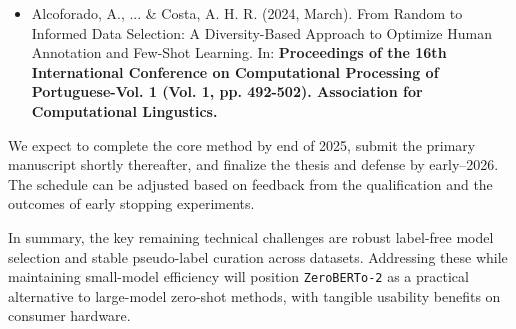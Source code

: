 \documentclass[]{politex-xico}
\begin{document}
\begin{itemize}  
    \item Alcoforado, A., ... \& Costa, A. H. R. (2024, March). From Random to Informed Data Selection: A Diversity-Based Approach to Optimize Human Annotation and Few-Shot Learning. In: \textbf{Proceedings of the 16th International Conference on Computational Processing of Portuguese-Vol. 1 (Vol. 1, pp. 492-502). Association for Computational Lingustics.}
\end{itemize}

We expect to complete the core method by end of 2025, submit the primary manuscript shortly thereafter, and finalize the thesis and defense by early–2026. The schedule can be adjusted based on feedback from the qualification and the outcomes of early stopping experiments.

\medskip
In summary, the key remaining technical challenges are robust label-free model selection and stable pseudo-label curation across datasets. Addressing these while maintaining small-model efficiency will position \texttt{ZeroBERTo-2} as a practical alternative to large-model zero-shot methods, with tangible usability benefits on consumer hardware.



%







\end{document}
